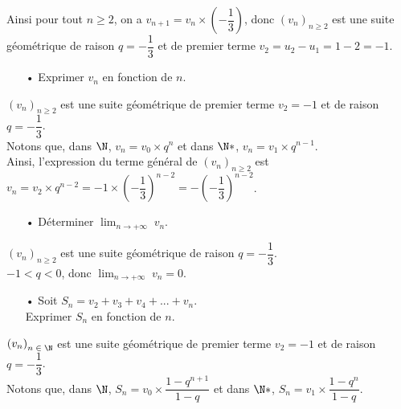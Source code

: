 \vspace*{.3cm}

Ainsi pour tout $n \geqslant 2$, on a $v_{n+1} = v_n \times \left(-\dfrac{1}{3}\right)$, donc $\left(v_n\right)_{n \geqslant 2}$ est une suite géométrique de raison $q = -\dfrac{1}{3}$ et de premier terme $v_2 = u_2 - u_1 = 1 - 2 = -1$. \\

\begin{itemize}
\item[•] Exprimer $v_n$ en fonction de $n$. \\
\end{itemize}

$\left(v_n\right)_{n \geqslant 2}$ est une suite géométrique de premier terme $v_2 = -1$ et de raison $q = -\dfrac{1}{3}$. \\

Notons que, dans $\N$, $v_n = v_0 \times q^n$ et dans $\N*$, $v_n = v_1 \times q^{n-1}$. \\

Ainsi, l'expression du terme général de $\left(v_n\right)_{n \geqslant 2}$ est $v_n = v_2 \times q^{n-2} = -1 \times \left(-\dfrac{1}{3}\right)^{n-2} = -\left(-\dfrac{1}{3}\right)^{n-2}$. \\

\begin{itemize}
\item[•] Déterminer $ \displaystyle {\lim_{n \rightarrow +\infty}} \; v_n$. \\
\end{itemize}

$\left(v_n\right)_{n \geqslant 2}$ est une suite géométrique de raison $q = -\dfrac{1}{3}$. \\

$-1 < q < 0$, donc $ \displaystyle {\lim_{n \rightarrow +\infty}} \; v_n = 0$. \\

\begin{itemize}
\item[•] Soit $S_n = v_2 + v_3 + v_4 + ... + v_n$. \\ Exprimer $S_n$ en fonction de $n$. \\
\end{itemize}

$\left(v_n\right)_{n \; \in \; \N}$ est une suite géométrique de premier terme $v_2 = -1$ et de raison $q = -\dfrac{1}{3}$. \\

Notons que, dans $\N$, $S_n = v_0 \times \dfrac{1 - q^{n+1}}{1 - q}$ et dans $\N*$, $S_n = v_1 \times \dfrac{1-q^n}{1-q}$. \\

